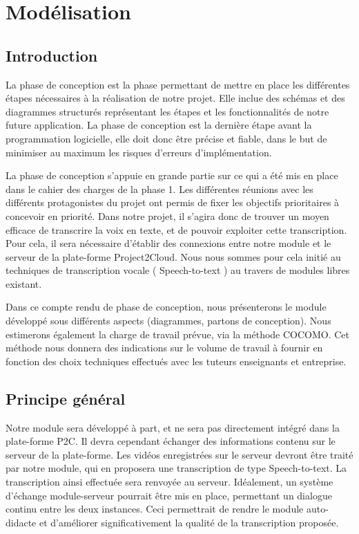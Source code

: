 	
	\part{Modélisation}
	
	\setcounter{chapter}{0} %
	\setcounter{section}{0} %
	
	\renewcommand*{\theHchapter}{\thepart.\thechapter}
	\chapter{Introduction}
	La phase de conception est la phase permettant de mettre en place les différentes étapes nécessaires à la réalisation de notre projet. Elle inclue des schémas et des diagrammes structurés représentant les étapes et les fonctionnalités de notre future application. La phase de conception est la dernière étape avant la programmation logicielle, elle doit donc être précise et fiable, dans le but de minimiser au maximum les risques d'erreurs d'implémentation. 
	
	La phase de conception s'appuie en grande partie sur ce qui a été mis en place dans le cahier des charges de la phase 1. Les différentes réunions avec les différents protagonistes du projet ont permis de fixer les objectifs prioritaires à concevoir en priorité. Dans notre projet, il s'agira donc de trouver un moyen efficace de transcrire la voix en texte, et de pouvoir exploiter cette transcription. Pour  cela, il sera nécessaire d'établir des connexions entre notre module et le serveur de la plate-forme Project2Cloud. Nous nous sommes pour cela initié au techniques de transcription vocale ( Speech-to-text ) au travers de modules libres existant.

	 Dans ce compte rendu de phase de conception, nous présenterons le module développé sous différents aspects (diagrammes, partons de conception). Nous estimerons également la charge de travail prévue, via la méthode COCOMO. Cet méthode nous donnera des indications sur le volume de travail à fournir en fonction des choix techniques effectués avec les tuteurs enseignants et entreprise. 


	\chapter{Principe général}
	Notre module sera développé à part, et ne sera pas directement intégré dans la plate-forme P2C. Il devra cependant échanger des informations contenu sur le serveur de la plate-forme. Les vidéos enregistrées sur le serveur devront être traité par notre module, qui en proposera une transcription de type Speech-to-text. La transcription ainsi effectuée sera renvoyée au serveur. Idéalement, un système d'échange module-serveur pourrait être mis en place, permettant un dialogue continu entre les deux instances. Ceci permettrait de rendre le module auto-didacte et d'améliorer significativement la qualité de la transcription proposée. 

